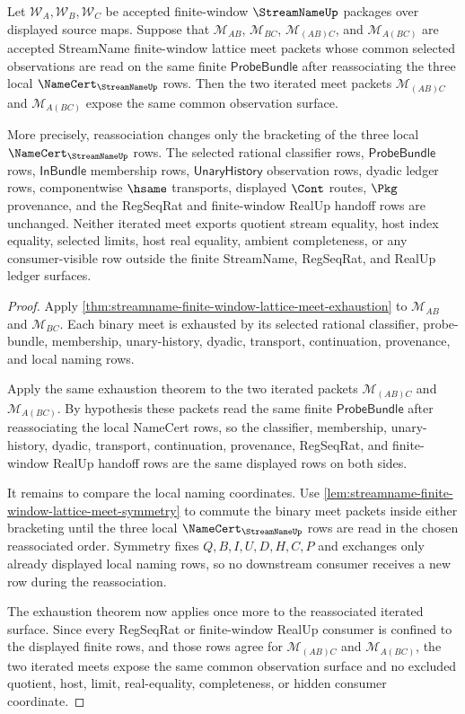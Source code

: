 \begin{theorem}
\label{thm:streamname-finite-window-lattice-meet-associativity}
Let $\mathcal W_A,\mathcal W_B,\mathcal W_C$ be accepted finite-window
$\StreamNameUp$ packages over displayed source maps. Suppose that
$\mathcal M_{AB}$, $\mathcal M_{BC}$, $\mathcal M_{(AB)C}$, and
$\mathcal M_{A(BC)}$ are accepted StreamName finite-window lattice meet
packets whose common selected observations are read on the same finite
$\mathsf{ProbeBundle}$ after reassociating the three local
$\NameCert_{\StreamNameUp}$ rows. Then the two iterated meet packets
$\mathcal M_{(AB)C}$ and $\mathcal M_{A(BC)}$ expose the same common
observation surface.

More precisely, reassociation changes only the bracketing of the three local
$\NameCert_{\StreamNameUp}$ rows. The selected rational classifier rows,
$\mathsf{ProbeBundle}$ rows, $\mathsf{InBundle}$ membership rows,
$\mathsf{UnaryHistory}$ observation rows, dyadic ledger rows, componentwise
$\hsame$ transports, displayed $\Cont$ routes, $\Pkg$ provenance, and the
RegSeqRat and finite-window RealUp handoff rows are unchanged. Neither
iterated meet exports quotient stream equality, host index equality, selected
limits, host real equality, ambient completeness, or any consumer-visible row
outside the finite StreamName, RegSeqRat, and RealUp ledger surfaces.
\end{theorem}
\begin{proof}
Apply \autoref{thm:streamname-finite-window-lattice-meet-exhaustion} to
$\mathcal M_{AB}$ and $\mathcal M_{BC}$. Each binary meet is exhausted by its
selected rational classifier, probe-bundle, membership, unary-history,
dyadic, transport, continuation, provenance, and local naming rows.

Apply the same exhaustion theorem to the two iterated packets
$\mathcal M_{(AB)C}$ and $\mathcal M_{A(BC)}$. By hypothesis these packets
read the same finite $\mathsf{ProbeBundle}$ after reassociating the local
NameCert rows, so the classifier, membership, unary-history, dyadic,
transport, continuation, provenance, RegSeqRat, and finite-window RealUp
handoff rows are the same displayed rows on both sides.

It remains to compare the local naming coordinates. Use
\autoref{lem:streamname-finite-window-lattice-meet-symmetry} to commute the
binary meet packets inside either bracketing until the three local
$\NameCert_{\StreamNameUp}$ rows are read in the chosen reassociated order.
Symmetry fixes $Q,B,I,U,D,H,C,P$ and exchanges only already displayed local
naming rows, so no downstream consumer receives a new row during the
reassociation.

The exhaustion theorem now applies once more to the reassociated iterated
surface. Since every RegSeqRat or finite-window RealUp consumer is confined
to the displayed finite rows, and those rows agree for
$\mathcal M_{(AB)C}$ and $\mathcal M_{A(BC)}$, the two iterated meets expose
the same common observation surface and no excluded quotient, host, limit,
real-equality, completeness, or hidden consumer coordinate.
\end{proof}

